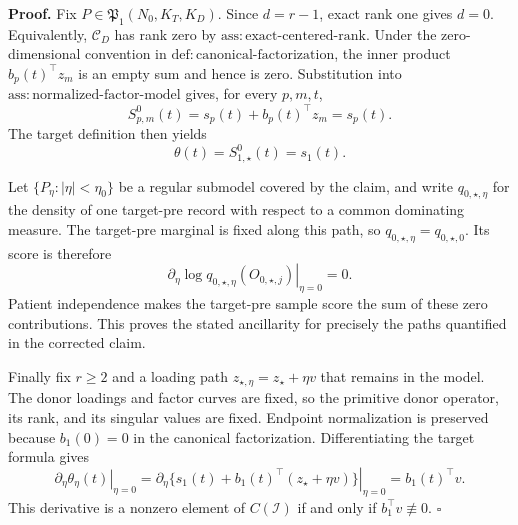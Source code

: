 \textbf{Proof.}
Fix \(P\in\mathfrak P_1(N_0,K_T,K_D)\).  Since \(d=r-1\), exact rank one gives \(d=0\).  Equivalently, \(\mathcal C_D\) has rank zero by \(\mathrm{ass:exact\mbox{-}centered\mbox{-}rank}\).  Under the zero-dimensional convention in \(\mathrm{def:canonical\mbox{-}factorization}\), the inner product \(b_p(t)^\top z_m\) is an empty sum and hence is zero.  Substitution into \(\mathrm{ass:normalized\mbox{-}factor\mbox{-}model}\) gives, for every \(p,m,t\),
\[
 S^0_{p,m}(t)=s_p(t)+b_p(t)^\top z_m=s_p(t).
\]
The target definition then yields
\[
 \theta(t)=S^0_{1,\star}(t)=s_1(t).
\]

Let \(\{P_\eta:|\eta|<\eta_0\}\) be a regular submodel covered by the claim, and write \(q_{0,\star,\eta}\) for the density of one target-pre record with respect to a common dominating measure.  The target-pre marginal is fixed along this path, so \(q_{0,\star,\eta}=q_{0,\star,0}\).  Its score is therefore
\[
 \left.\partial_\eta\log q_{0,\star,\eta}(O_{0,\star,j})\right|_{\eta=0}=0.
\]
Patient independence makes the target-pre sample score the sum of these zero contributions.  This proves the stated ancillarity for precisely the paths quantified in the corrected claim.

Finally fix \(r\ge2\) and a loading path \(z_{\star,\eta}=z_\star+\eta v\) that remains in the model.  The donor loadings and factor curves are fixed, so the primitive donor operator, its rank, and its singular values are fixed.  Endpoint normalization is preserved because \(b_1(0)=0\) in the canonical factorization.  Differentiating the target formula gives
\[
 \left.\partial_\eta\theta_\eta(t)\right|_{\eta=0}
 =\left.\partial_\eta\{s_1(t)+b_1(t)^\top(z_\star+\eta v)\}\right|_{\eta=0}
 =b_1(t)^\top v.
\]
This derivative is a nonzero element of \(C(\mathcal I)\) if and only if \(b_1^\top v\not\equiv0\). \(\square\)